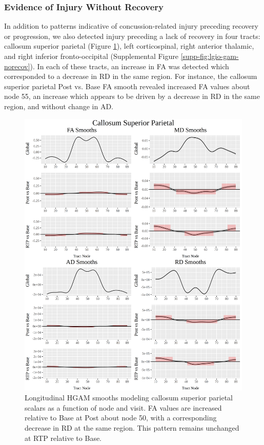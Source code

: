 \documentclass[12pt]{article}
\begin{document}
\subsubsection{Evidence of Injury Without Recovery}
\label{sssec:res-dwi-pat-norecov}
In addition to patterns indicative of concussion-related injury preceding recovery or progression, we also detected injury preceding a lack of recovery in four tracts: callosum superior parietal (Figure \ref{fig:lgio-gam-norecov}), left corticospinal, right anterior thalamic, and right inferior fronto-occipital (Supplemental Figure \ref{supp-fig:lgio-gam-norecov}). In each of these tracts, an increase in FA was detected which corresponded to a decrease in RD in the same region. For instance, the callosum superior parietal Post vs. Base FA smooth revealed increased FA values about node 55, an increase which appears to be driven by a decrease in RD in the same region, and without change in AD.

\begin{figure}[H]
	\centering
	\includegraphics[width=.8\linewidth]{fit_LGIO_CCsp.png}
	\caption{Longitudinal HGAM smooths modeling callosum superior parietal scalars as a function of node and visit. FA values are increased relative to Base at Post about node 50, with a corresponding decrease in RD at the same region. This pattern remains unchanged at RTP relative to Base.}
	\label{fig:lgio-gam-norecov}
\end{figure}
\end{document}
